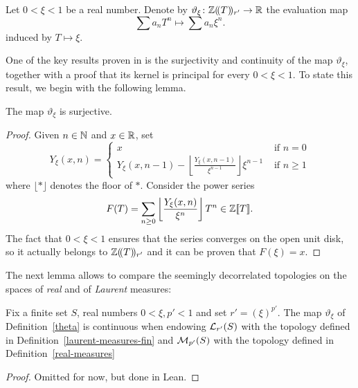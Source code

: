 \begin{definition}
  \label{theta}
  \leanok
  Let $0<\xi <1$ be a real number. Denote by $\vartheta_{\xi}\colon \mathbb{Z}(\!(T)\!)_{r'}\rightarrow \mathbb{R}$ the evaluation map
  \[
    \sum a_nT^n\longmapsto \sum a_n\xi^n.
  \]
induced by $T\mapsto \xi$.
\end{definition}

One of the key results proven in \cite[\S 6]{Analytic} is the surjectivity and continuity of the map $\vartheta_\xi$, together with a proof that its kernel is principal for every $0<\xi<1$. To state this result, we begin with the following lemma.


\begin{lemma}
  \label{theta.surjective}
  \leanok
  The map $\vartheta_{\xi}$ is surjective.
\end{lemma}

\begin{proof}
  \leanok
  Given $n\in\mathbb{N}$ and $x\in\mathbb{R}$, set
	\[
		Y_\xi(x, n)=
		\begin{cases}
			x&\text{ if } n = 0 \\
			Y_\xi(x,n-1) - \left\lfloor \frac{Y_\xi(x,n-1)}{\xi^{n-1}} \right\rfloor \xi^{n-1} & \text{ if } n \ge 1
		\end{cases}
	\]
where $\lfloor \ast \rfloor$ denotes the floor of $\ast$. Consider the power series
  \[
    F(T)=\sum_{n\geq 0}\left\lfloor \frac{Y_\xi(x,n)}{\xi^n}\right\rfloor T^n\in\mathbb{Z}[\![T]\!].
  \]
	The fact that $0<\xi<1$ ensures that the series converges on the open unit disk, so it actually belongs to $\mathbb{Z}(\!(T)\!)_{r'}$ and it can be proven that $F(\xi)=x$.
\end{proof}
The next lemma allows to compare the seemingly decorrelated topologies on the spaces of \emph{real} and of \emph{Laurent} measures:
\begin{lemma}
	\label{theta-continuous}
	\leanok
Fix a finite set $S$, real numbers $0<\xi,p'<1$ and set $r'=(\xi)^{p'}$. The map $\vartheta_\xi$ of Definition~\ref{theta} is continuous when endowing $\mathcal L_{r'}(S)$ with the topology defined in Definition~\ref{laurent-measures-fin} and $\mathcal M_{p'}(S)$ with the topology defined in Definition~\ref{real-measures}
\end{lemma}
\begin{proof}
  \leanok
  Omitted for now, but done in Lean.
\end{proof}


